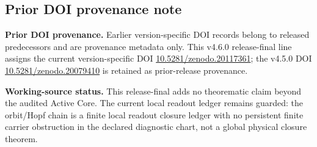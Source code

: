 \subsection*{Prior DOI provenance note}
\label{subsec:version-specific-doi-bearing-release-final-note}

\noindent\textbf{Prior DOI provenance.} Earlier version-specific DOI records belong to released predecessors and are provenance metadata only. This v4.6.0 release-final line assigns the current version-specific DOI \href{https://doi.org/10.5281/zenodo.20117361}{10.5281/zenodo.20117361}; the v4.5.0 DOI \href{https://doi.org/10.5281/zenodo.20079410}{10.5281/zenodo.20079410} is retained as prior-release provenance.

\noindent\textbf{Working-source status.} This release-final adds no theorematic claim beyond the audited Active Core. The current local readout ledger remains guarded: the orbit/Hopf chain is a finite local readout closure ledger with no persistent finite carrier obstruction in the declared diagnostic chart, not a global physical closure theorem.

